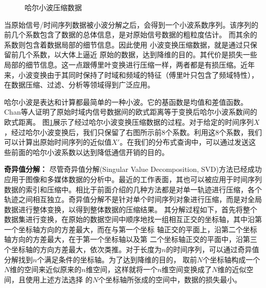 \begin{figure} [t]
	\centering
	\caption{哈尔小波压缩数据\cite{KeoghDimReduction}}
	\label{fig-chapter2-haar}
\end{figure}
当原始信号/时间序列数据被小波分解之后，会得到一个小波系数序列。该序列的前几个系数包含了数据的总体信息，是对原始信号数据的粗粒度估计。
而其余的系数则包含着数据局部的细节信息。因此使用 小波变换压缩数据，就是通过只保留前几个系数，以大体上逼近 原始的数据，达到降维的目的。其代价是损失一些局部的细节信息。这一点跟傅里叶变换进行压缩一样，两者都是有损压缩。近年来，小波变换由于其同时保持了时域和频域的特征（傅里叶只包含了频域特性），在数据压缩、过滤、分析等领域得到广泛应用。

哈尔小波是表达和计算都最简单的一种小波。它的基函数是均值和差值函数。
Chan等人证明了原始时域内信号数据间的欧式距离等于变换后哈尔小波系数间的欧式距离\cite{chan2003haar}。
图\ref{fig-chapter2-haar}展示了经过哈尔小波变换压缩数据的过程。对于给定的时间序列$X$，经过哈尔小波变换后，我们只保留了右图所示前8个系数。利用这8个系数，我们可以计算出原始时间序列的近似值$X'$。在我们的分布式查询中，可以通过发送这些前面的哈尔小波系数以达到降低通信开销的目的。

\textbf{奇异值分解：}
尽管奇异值分解(Singular Value Decomposition, SVD)方法已经成功应用于图像和多媒体数据的分析中。最近的工作表面，其也可以被应用于时间序列数据的索引和压缩中。相比于前面介绍的几种方法都是对单一轨迹进行压缩，各个轨迹之间相互独立。奇异值分解不是针对单个时间序列对象进行压缩，而是对全局数据进行整体变换，以得到整体数据的压缩结果。
其分解过程如下，首先将整个数据集进行变换，在原始的数据空间中顺序地找一组相互正交的坐标轴，其中沿第一个坐标轴方向的方差最大，而在与第一个坐标 轴正交的平面上，沿第二个坐标轴方向的方差最大，在于第一个坐标轴以及第 二个坐标轴正交的平面中，沿第三个坐标轴的方向方差最大，依次类推。对于长度为$n$的时间序列，可以通过奇异值分解找到$n$个满足条件的坐标轴。为了达到降维的目的，
取前$N$个坐标轴构成一个$N$维的空间来近似原来的$n$维空间，这样就将一个$n$维空间变换成了$N$维的近似空间，且使用上述方法选择 的$N$个坐标轴所张成的空间中，数据的损失最小。

